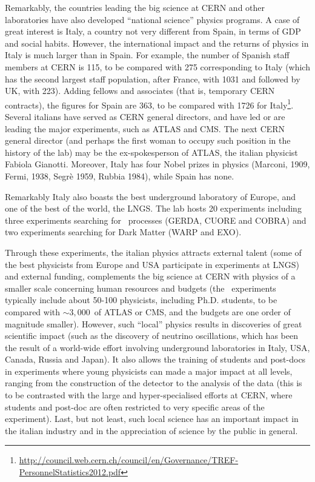 Remarkably, the countries leading the big science at CERN and other laboratories have also developed ``national science'' physics programs. A case of great interest is Italy, a country not very different from Spain, in terms of GDP and social habits. However, the international impact and the returns of physics in Italy is much larger than in Spain. For example, the number of Spanish staff members at CERN is 115, to be compared with 275 corresponding to Italy (which has the second largest staff population, after France, with 1031 and followed by UK, with 223). Adding fellows and associates (that is, temporary CERN contracts), the figures for Spain are 363, to be compared with 1726 for Italy\footnote{\href{http://council.web.cern.ch/council/en/Governance/TREF-PersonnelStatistics2012.pdf}{http://council.web.cern.ch/council/en/Governance/TREF-PersonnelStatistics2012.pdf}}. Several italians have served as CERN general directors, and have led or are leading the major experiments, such as ATLAS and CMS. The next CERN general director (and perhaps the first woman to occupy such position in the history of the lab) may be the ex-spokesperson of ATLAS, the italian physicist Fabiola Gianotti. Moreover, Italy has four Nobel prizes in physics (Marconi, 1909, Fermi, 1938, Segrè 1959, Rubbia 1984), while Spain has none. 

Remarkably Italy also boasts the best underground laboratory of Europe, and one of the best of the world, the LNGS. The lab hosts 20 experiments including three experiments searching for \bbonu\ processes (GERDA, CUORE and COBRA) and two experiments searching for Dark Matter (WARP and EXO). 

Through these experiments, the italian physics attracts external talent (some of the best physicists from Europe and USA participate in experiments at LNGS) and external funding, complements the big science at CERN with physics of a smaller scale concerning human resources and budgets (the \bbonu\ experiments typically include about 50-100 physicists, including Ph.D. students, to be compared with $\sim 3,000$~of ATLAS or CMS, and the budgets are one order of magnitude smaller). However, such ``local'' physics results in discoveries of great scientific impact (such as the discovery of neutrino oscillations, which has been the result of a world-wide effort involving underground laboratories in Italy, USA, Canada, Russia and Japan). It also allows the training of students and post-docs in experiments where young physicists can made a major impact at all levels, ranging from the construction of the detector to the analysis of the data (this is to be contrasted with the large and hyper-specialised efforts at CERN, where students and post-doc are often restricted to very specific areas of the experiment). Last, but not least, such local science has an important impact in the italian industry and in the appreciation of science by the public in general. 

